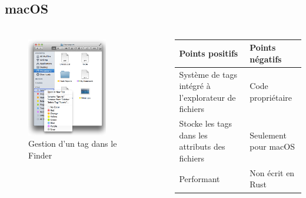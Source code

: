 \documentclass[10pt]{beamer}
\begin{document}
\subsection{macOS}
\begin{frame}
    \frametitle{\subsecname}
    \fontsize{8pt}{9}\selectfont
    \begin{columns}[T]
        \begin{column}{.55\textwidth}
            \begin{center}
                \begin{figure}
                    \includegraphics[width=0.7\textwidth]{images/macos_tags.png}
                    \caption{Gestion d'un tag dans le Finder \cite{ref5}}
                \end{figure}
            \end{center}
        \end{column}
        \pause
        \begin{column}{.45\textwidth}
            \begin{flushleft}
                \begin{tabularx}{5cm}{|X|X|} \hline
                    \textbf{Points positifs} & \textbf{Points négatifs} \\ \hline
                    Système de tags intégré à l'explorateur de fichiers & Code propriétaire \\ \hline
                    Stocke les tags dans les attributs des fichiers & Seulement pour macOS \\ \hline
                    Performant & Non écrit en Rust \\ \hline
                \end{tabularx}
            \end{flushleft}
        \end{column}
    \end{columns}
\end{frame}
\end{document}
